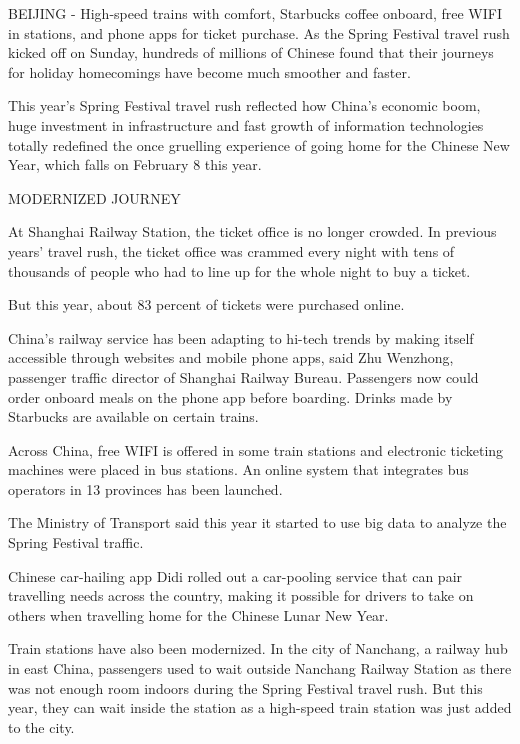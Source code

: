 \begin{displayquote}

	BEIJING - High-speed trains with comfort, Starbucks coffee onboard, free
	WIFI in stations, and phone apps for ticket purchase. As the Spring
	Festival travel rush kicked off on Sunday, hundreds of millions of
	Chinese found that their journeys for holiday homecomings have become
	much smoother and faster.

	This year's Spring Festival travel rush reflected how China's economic
	boom, huge investment in infrastructure and fast growth of information
	technologies totally redefined the once gruelling experience of going
	home for the Chinese New Year, which falls on February 8 this year.

	MODERNIZED JOURNEY

	At Shanghai Railway Station, the ticket office is no longer crowded. In
	previous years' travel rush, the ticket office was crammed every night
	with tens of thousands of people who had to line up for the whole night
	to buy a ticket.

	But this year, about 83 percent of tickets were purchased online.

	China's railway service has been adapting to hi-tech trends by making
	itself accessible through websites and mobile phone apps, said Zhu
	Wenzhong, passenger traffic director of Shanghai Railway Bureau.
	Passengers now could order onboard meals on the phone app before
	boarding. Drinks made by Starbucks are available on certain trains.

	Across China, free WIFI is offered in some train stations and electronic
	ticketing machines were placed in bus stations. An online system that
	integrates bus operators in 13 provinces has been launched.

	The Ministry of Transport said this year it started to use big data to
	analyze the Spring Festival traffic.

	Chinese car-hailing app Didi rolled out a car-pooling service that can
	pair travelling needs across the country, making it possible for drivers
	to take on others when travelling home for the Chinese Lunar New Year.

	Train stations have also been modernized. In the city of Nanchang, a
	railway hub in east China, passengers used to wait outside Nanchang
	Railway Station as there was not enough room indoors during the Spring
	Festival travel rush. But this year, they can wait inside the station as
	a high-speed train station was just added to the city.


\end{displayquote}
